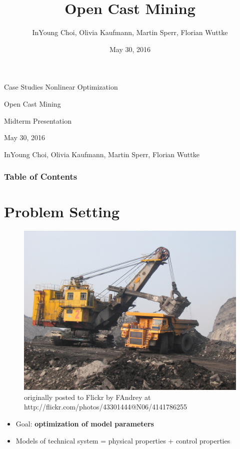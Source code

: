 \documentclass{beamer}
\title[Kurzform]{Open Cast Mining}
\author{InYoung Choi, Olivia Kaufmann, Martin Sperr, Florian Wuttke}
\date{May 30, 2016}
\begin{document}

\begin{frame}[c]
	\begin{center}
		\large{Case Studies Nonlinear Optimization}
	\end{center}
	\vspace{0.5cm}
	\begin{center}
		\Huge{\textcolor{TUMblau2}{Open Cast Mining}}
	\end{center}
	\begin{center}
		\large{Midterm Presentation}
	\end{center}
	\vspace{0.5cm}
	\begin{center}
		May 30, 2016
	\end{center}
	\vspace{0.5cm}
	\begin{center}
		\small{InYoung Choi, Olivia Kaufmann, Martin Sperr, Florian Wuttke}
	\end{center}
\end{frame}

\begin{frame}[c]
	\frametitle{Table of Contents}
	\tableofcontents
\end{frame}


\section{Problem Setting}

\begin{frame}
	\begin{figure}[t]
		\centering
		\includegraphics[width=.6\linewidth]{Exc/Excavator} \\
		\tiny{originally posted to Flickr by FAndrey at http://flickr.com/photos/43301444@N06/4141786255}
	\end{figure}

	\begin{itemize}
		\item{Goal: \textbf{optimization of model parameters}}
		\item{Models of technical system = physical properties + control properties}
	\end{itemize}
\end{frame}
\end{document}

